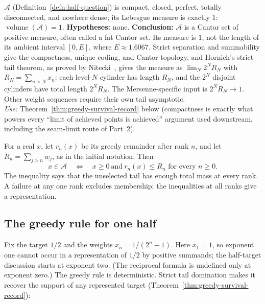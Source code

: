 \begin{thm}
\label{thm:topology}
$\mathcal{A}$ (Definition~\ref{defn:half-question}) is compact, closed, perfect, totally
disconnected, and nowhere dense; its Lebesgue measure is exactly $1$:
$\operatorname{volume}(\mathcal{A}) = 1$. \textbf{Hypotheses:} none. \textbf{Conclusion:}
$\mathcal A$ is a Cantor set of positive measure, often called a
fat Cantor set.  Its measure is $1$, not the length of its ambient
interval $[0,E]$, where $E\approx1.6067$.
Strict separation and summability give the compactness, unique coding, and Cantor topology, and
Hornich's strict-tail theorem, as proved by Nitecki~\cite[Theorem~4(1), p.~9]{nitecki2013}, gives
the measure as $\lim_N2^NR_N$ with $R_N=\sum_{n>N}x_n$: each level-$N$ cylinder has length $R_N$,
and the $2^N$ disjoint cylinders have total length $2^NR_N$. The Mersenne-specific input is
$2^NR_N\to1$. Other weight sequences require their own tail asymptotic.\\
\textit{Use:} Theorem~\ref{thm:greedy-survival-record} below (compactness is exactly what powers
every ``limit of achieved points is achieved'' argument used downstream, including the seam-limit
route of Part~2).
\end{thm}

\begin{thm}
\label{thm:greedy-survival-record}
For a real $x$, let $r_n(x)$ be its greedy remainder after rank $n$,
and let $R_n=\sum_{j>n}w_j$, as in the initial notation.  Then
\[
 x\in\mathcal A\quad\Longleftrightarrow\quad
 x\ge0\ \text{and}\ r_n(x)\le R_n\text{ for every }n\ge0.
\]
The inequality says that the unselected tail has enough total mass
at every rank.  A failure at any one rank excludes membership;
the inequalities at all ranks give a representation.
\end{thm}

\subsection{The greedy rule for one half}
\label{ssec:greedy-orbit}

Fix the target $1/2$ and the weights $x_n = 1/(2^n-1)$. Here $x_1=1$, so exponent one cannot occur
in a representation of $1/2$ by positive summands; the half-target discussion starts at exponent
two. (The reciprocal formula is undefined only at exponent zero.) The greedy
rule is deterministic.  Strict tail domination makes it recover the
support of any represented target
(Theorem~\ref{thm:greedy-survival-record}):

